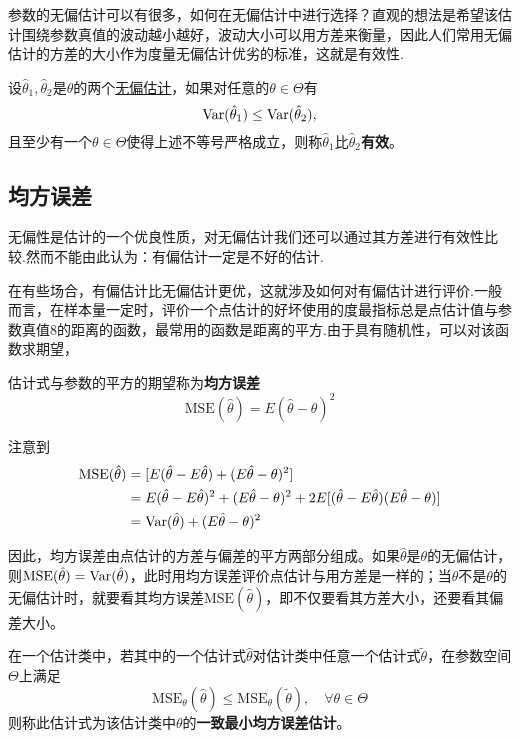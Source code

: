 参数的无偏估计可以有很多，如何在无偏估计中进行选择？直观的想法是希望该估计围绕参数真值的波动越小越好，波动大小可以用方差来衡量，因此人们常用无偏估计的方差的大小作为度量无偏估计优劣的标准，这就是有效性.

\begin{definition}[有效性]
    设$\hat\theta_1,\hat\theta_2$是$\theta$的两个\underline{无偏估计}，如果对任意的$\theta\in\Theta$有
    \[ \operatorname{Var}(\hat\theta_1) \le \operatorname{Var}(\hat\theta_2),  \]
    且至少有一个$\theta\in\Theta$使得上述不等号严格成立，则称$\hat\theta_1$比$\hat\theta_2$\textbf{有效}。
\end{definition}

\subsection{均方误差}
无偏性是估计的一个优良性质，对无偏估计我们还可以通过其方差进行有效性比较.然而不能由此认为：有偏估计一定是不好的估计.

在有些场合，有偏估计比无偏估计更优，这就涉及如何对有偏估计进行评价.一般而言，在样本量一定时，评价一个点估计的好坏使用的度最指标总是点估计值与参数真值8的距离的函数，最常用的函数是距离的平方.由于具有随机性，可以对该函数求期望，

\begin{definition}\label{def:MSE}
    估计式与参数的平方的期望称为\textbf{均方误差}
    \[ \text{MSE}(\hat\theta) = E(\hat\theta-\theta)^2 \]
\end{definition}

注意到
\begin{align*}
    \text{MSE}(\hat\theta) & = [ E(\hat\theta - E\hat\theta) + (E\hat\theta - \theta)^2 ]                                                     \\
                           & = E (\hat\theta - E\hat\theta)^2 + (E\hat\theta - \theta)^2 + 2E[(\hat\theta - E\hat\theta)(E\hat\theta-\theta)] \\
                           & = \operatorname{Var}(\hat\theta) + (E\hat\theta - \theta)^2
\end{align*}

因此，均方误差由点估计的方差与偏差的平方两部分组成。如果$\hat\theta$是$\theta$的无偏估计，则$\text{MSE}(\hat\theta)=\operatorname{Var}(\hat\theta)$，此时用均方误差评价点估计与用方差是一样的；当$\hat\theta$不是$\theta$的无偏估计时，就要看其均方误差$\text{MSE}(\hat\theta)$，即不仅要看其方差大小，还要看其偏差大小。

\begin{definition}[一致最小均方误差估计]\label{def:minimum_MSE_estimation}
    在一个估计类中，若其中的一个估计式$\hat{\theta}$对估计类中任意一个估计式$\tilde{\theta}$，在参数空间$\Theta$上满足
    \[ \text{MSE}_{\theta}(\hat\theta) \le \text{MSE}_{\theta}(\tilde\theta) ,\quad \forall \theta \in \Theta  \]
    则称此估计式为该估计类中$\theta$的\textbf{一致最小均方误差估计}。
\end{definition}

